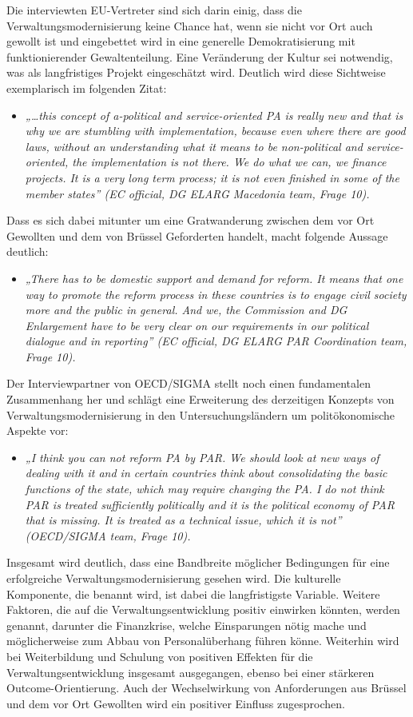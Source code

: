 Die interviewten EU-Vertreter sind sich darin einig, dass die Verwaltungsmodernisierung keine Chance hat, wenn sie nicht vor Ort auch gewollt ist und eingebettet wird in eine generelle Demokratisierung mit funktionierender Gewaltenteilung. Eine Veränderung der Kultur sei notwendig, was als langfristiges Projekt eingeschätzt wird. Deutlich wird diese Sichtweise exemplarisch im folgenden Zitat:
\begin{itemize}[label={}]
\item \textit{„…this concept of a-political and service-oriented PA is really new and that is why we are stumbling with implementation, because even where there are good laws, without an understanding what it means to be non-political and service-oriented, the implementation is not there. We do what we can, we finance projects. It is a very long term process; it is not even finished in some of the member states” (EC official, DG ELARG Macedonia team, Frage 10).}
\end{itemize}
Dass es sich dabei mitunter um eine Gratwanderung zwischen dem vor Ort Gewollten und dem von Brüssel Geforderten handelt, macht folgende Aussage deutlich:
\begin{itemize}[label={}]
\item \textit{„There has to be domestic support and demand for reform. It means that one way to promote the reform process in these countries is to engage civil society more and the public in general. And we, the Commission and DG Enlargement have to be very clear on our requirements in our political dialogue and in reporting” (EC official, DG ELARG PAR Coordination team, Frage 10).}
\end{itemize}
Der Interviewpartner von OECD/SIGMA stellt noch einen fundamentalen Zusammenhang her und schlägt eine Erweiterung des derzeitigen Konzepts von Verwaltungsmodernisierung in den Untersuchungsländern um politökonomische Aspekte vor:
\begin{itemize}[label={}]
\item \textit{„I think you can not reform PA by PAR. We should look at new ways of dealing with it and in certain countries think about consolidating the basic functions of the state, which may require changing the PA. I do not think PAR is treated sufficiently politically and it is the political economy of PAR that is missing. It is treated as a technical issue, which it is not” (OECD/SIGMA team, Frage 10).}
\end{itemize}

Insgesamt wird deutlich, dass eine Bandbreite möglicher Bedingungen für eine erfolgreiche Verwaltungsmodernisierung gesehen wird. Die kulturelle Komponente, die benannt wird, ist dabei die langfristigste Variable. Weitere Faktoren, die auf die Verwaltungsentwicklung positiv einwirken könnten, werden genannt, darunter die Finanzkrise, welche Einsparungen nötig mache und möglicherweise zum Abbau von Personalüberhang führen könne. Weiterhin wird bei Weiterbildung und Schulung von positiven Effekten für die Verwaltungsentwicklung insgesamt ausgegangen, ebenso bei einer stärkeren Outcome-Orientierung. Auch der Wechselwirkung von Anforderungen aus Brüssel und dem vor Ort Gewollten wird ein positiver Einfluss zugesprochen.


